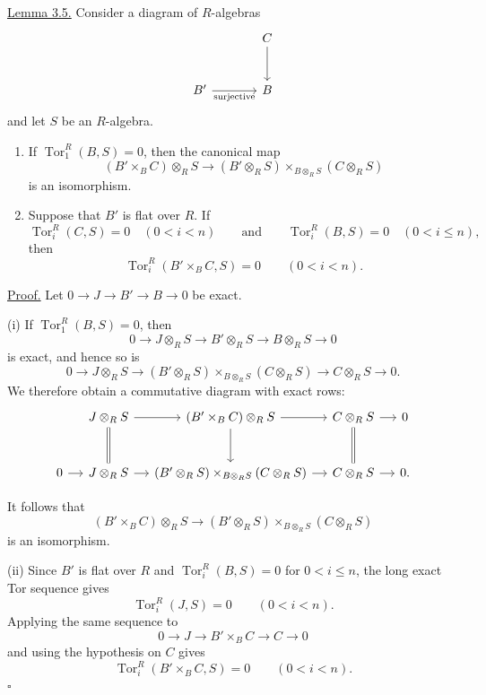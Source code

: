 \underline{Lemma 3.5.} Consider a diagram of $R$-algebras
\[
\begin{tikzcd}[column sep=large,row sep=large]
 & C \arrow[d]\\
 B' \arrow[r,"\text{surjective}"'] & B
\end{tikzcd}
\]
and let $S$ be an $R$-algebra.

\begin{enumerate}[label=(\roman*)]
\item If $\operatorname{Tor}_1^R(B,S)=0$, then the canonical map
\[
 (B'\times_BC)\otimes_RS
 \longrightarrow
 (B'\otimes_RS)\times_{B\otimes_RS}(C\otimes_RS)
\]
is an isomorphism.

\item Suppose that $B'$ is flat over $R$. If
\[
 \operatorname{Tor}_i^R(C,S)=0\quad(0<i<n)
 \qquad\text{and}\qquad
 \operatorname{Tor}_i^R(B,S)=0\quad(0<i\leq n),
\]
then
\[
 \operatorname{Tor}_i^R(B'\times_BC,S)=0\qquad(0<i<n).
\]
\end{enumerate}

\underline{Proof.} Let
$0\longrightarrow J\longrightarrow B'\longrightarrow B
\longrightarrow0$ be exact.

(i) If $\operatorname{Tor}_1^R(B,S)=0$, then
\[
 0\longrightarrow J\otimes_RS\longrightarrow B'\otimes_RS
 \longrightarrow B\otimes_RS\longrightarrow0
\]
is exact, and hence so is
\[
 0\longrightarrow J\otimes_RS
 \longrightarrow
 (B'\otimes_RS)\times_{B\otimes_RS}(C\otimes_RS)
 \longrightarrow C\otimes_RS\longrightarrow0.
\]
We therefore obtain a commutative diagram with exact rows:
\[
 \begin{tikzcd}[column sep=small,row sep=large]
 & J\otimes_RS \arrow[r] \arrow[d,equal]
 & (B'\times_BC)\otimes_RS \arrow[r] \arrow[d]
 & C\otimes_RS \arrow[r] \arrow[d,equal]
 & 0\\
 0 \arrow[r] & J\otimes_RS \arrow[r]
 & (B'\otimes_RS)\times_{B\otimes_RS}(C\otimes_RS) \arrow[r]
 & C\otimes_RS \arrow[r] & 0.
 \end{tikzcd}
\]


It follows that
\[
 (B'\times_BC)\otimes_RS
 \longrightarrow
 (B'\otimes_RS)\times_{B\otimes_RS}(C\otimes_RS)
\]
is an isomorphism.

(ii) Since $B'$ is flat over $R$ and
$\operatorname{Tor}_i^R(B,S)=0$ for $0<i\leq n$, the long exact
Tor sequence gives
\[
 \operatorname{Tor}_i^R(J,S)=0\qquad(0<i<n).
\]
Applying the same sequence to
\[
 0\longrightarrow J\longrightarrow B'\times_BC
 \longrightarrow C\longrightarrow0
\]
and using the hypothesis on $C$ gives
\[
 \operatorname{Tor}_i^R(B'\times_BC,S)=0\qquad(0<i<n).
\]
\hfill$\square$

